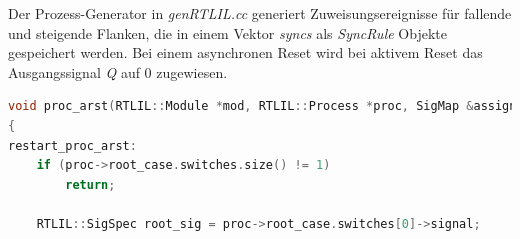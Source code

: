 \documentclass[11pt]{report}
\begin{document}
\begin{enumerate}
Der Prozess-Generator in \textit{genRTLIL.cc} generiert Zuweisungsereignisse für fallende und steigende Flanken, die in einem Vektor \textit{syncs} als \textit{SyncRule} Objekte gespeichert werden.
Bei einem asynchronen Reset wird bei aktivem Reset das Ausgangssignal \textit{Q} auf 0 zugewiesen.   
\begin{lstlisting}[language=C++]
void proc_arst(RTLIL::Module *mod, RTLIL::Process *proc, SigMap &assign_map)
{
restart_proc_arst:
	if (proc->root_case.switches.size() != 1)
		return;

	RTLIL::SigSpec root_sig = proc->root_case.switches[0]->signal;


\end{lstlisting}
\end{enumerate}
\end{document}

